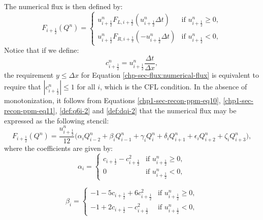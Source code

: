 The numerical flux is then defined by:
\begin{equation}
	\label{chp-sec-flux:numerical-flux}
	F_{i+\frac{1}{2}}(Q^n) =  
    	\begin{cases}
		u_{i+\frac{1}{2}}^nF_{L,i+\frac{1}{2}}( u_{i+\frac{1}{2}}^n\Delta t) & \text{if } u_{i+\frac{1}{2}}^n \geq 0,\\
		u_{i+\frac{1}{2}}^nF_{R,i+\frac{1}{2}}(-u_{i+\frac{1}{2}}^n\Delta t) & \text{if } u_{i+\frac{1}{2}}^n<0,
    	\end{cases}
\end{equation}
Notice that if we define:
\begin{equation}
	\label{chp-sec-flux:cedges}
	c_{i+\frac{1}{2}}^n = u_{i+\frac{1}{2}}^n\frac{\Delta t}{\Delta x},
\end{equation}
the requirement $y\leq \Delta x$ for 
Equation \eqref{chp-sec-flux:numerical-flux} is equivalent
to require that $|c^{n}_{i+\frac{1}{2}}| \leq 1$ for all $i$,  which is the CFL condition.
In the absence of monotonization, it follows from Equations
\eqref{chp1-sec-recon-ppm-eq10}, \eqref{chp1-sec-recon-ppm-eq11},
\eqref{def:q6i-2} and \eqref{def:dqi-2}
that the numerical flux may be expressed as the following stencil:
\begin{equation}
	\label{chp-sec-flux:numerical-flux-stencil}
	F_{i+\frac{1}{2}}(Q^n) = \frac{u_{i+\frac{1}{2}}^n}{12} \bigg( 
	\alpha_iQ_{i-2}^n + \beta_i Q_{i-1}^n + 
	\gamma_i Q_{i}^n + \delta_i Q_{i+1}^n + \epsilon_i Q_{i+2}^n
	+\zeta_i Q_{i+3}^n \bigg),
\end{equation}
where the coefficients are given by:
\begin{equation}
	\label{chp-sec-flux:numerical-flux-stencil-alpha}
	\alpha_i =  
    	\begin{cases}
		c_{i+\frac{1}{2}}-c_{i+\frac{1}{2}}^2 &
		\text{if } u_{i+\frac{1}{2}}^n \geq 0,\\
		0 & \text{if } u_{i+\frac{1}{2}}^n<0,
    	\end{cases}
\end{equation}

\begin{equation}
	\label{chp-sec-flux:numerical-flux-stencil-beta}
	\beta_i =  
    	\begin{cases}
		-1 - 5c_{i+\frac{1}{2}}  + 6c_{i+\frac{1}{2}}^2 
		& \text{if } u_{i+\frac{1}{2}}^n \geq 0,\\
		-1 +  2c_{i+\frac{1}{2}}   -   c_{i+\frac{1}{2}}^2 & \text{if } u_{i+\frac{1}{2}}^n<0,
    	\end{cases}
\end{equation}

